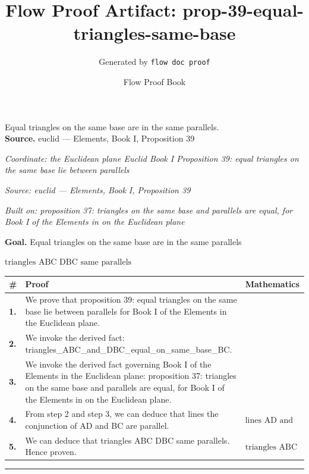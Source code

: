 \documentclass[11pt]{article}
\title{Flow Proof Artifact: prop-39-equal-triangles-same-base}
\author{Generated by \texttt{flow doc proof}}
\date{Flow Proof Book}
\theoremstyle{definition}
\begin{document}
\maketitle
Equal triangles on the same base are in the same parallels.\\[0.5em]
\textbf{Source.} euclid — Elements, Book I, Proposition 39\\[0.5em]
\bigskip
{}\par
\smallskip\noindent\textit{Coordinate: the Euclidean plane \cdot Euclid Book I \cdot Proposition 39: equal triangles on the same base lie between parallels}\par
\smallskip\noindent\textit{Source: euclid — Elements, Book I, Proposition 39}\par
\smallskip\noindent\textit{Built on: proposition 37: triangles on the same base and parallels are equal, for Book I of the Elements in on the Euclidean plane}\par
\medskip
\noindent\textbf{Goal.} Equal triangles on the same base are in the same parallels\par
\noindent$\displaystyle \text{triangles ABC DBC same parallels}$\par
\medskip
\noindent
\begin{tabular}{@{} >{\raggedright\arraybackslash}p{} >{\raggedright\arraybackslash}p{} >{\raggedleft\arraybackslash}p{} @{}}
\textbf{\#} & \textbf{Proof} & \textbf{Mathematics} \\
\midrule
\textbf{1.} & We prove that proposition 39: equal triangles on the same base lie between parallels for Book I of the Elements in the Euclidean plane. & \\[0.45em]
\textbf{2.} & We invoke the derived fact: triangles\_ABC\_and\_DBC\_equal\_on\_same\_base\_BC. & \\[0.45em]
\textbf{3.} & We invoke the derived fact governing Book I of the Elements in the Euclidean plane: proposition 37: triangles on the same base and parallels are equal, for Book I of the Elements in on the Euclidean plane. & \\[0.45em]
\textbf{4.} & From step 2 and step 3, we can deduce that lines the conjunction of AD and BC are parallel. & $\displaystyle \text{lines AD and BC are parallel}$ \\[0.45em]
\textbf{5.} & We can deduce that triangles ABC DBC same parallels. Hence proven. & $\displaystyle \text{triangles ABC DBC same parallels}$ \\[0.45em]
\bottomrule
\end{tabular}
\label{thm:Geometry-Euclid Book I-proposition_39_equal_triangles_on_the_same_base_lie_between_parallels}
\par\medskip\hrule
\end{document}
